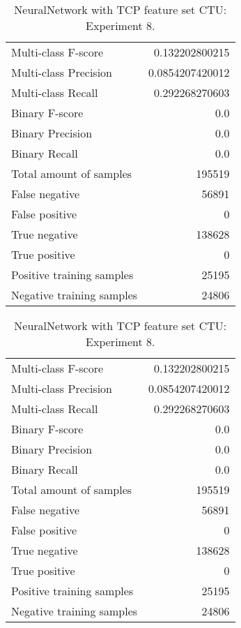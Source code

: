 \begin{table}[H]
\begin{minipage}{0.5\textwidth}
\caption{NeuralNetwork with TCP feature set CTU: \\Experiment 7.}
\centering
\begin{tabular}{l r}
\toprule
Multi-class F-score & 0.132202800215 \\
Multi-class Precision & 0.0854207420012 \\
Multi-class Recall & 0.292268270603 \\
\midrule
Binary F-score & 0.0 \\
Binary Precision & 0.0 \\
Binary Recall & 0.0 \\
\midrule
Total amount of samples & 195519 \\
False negative & 56891 \\
False positive & 0 \\
True negative & 138628 \\
True positive & 0 \\
\midrule
Positive training samples & 25195 \\
Negative training samples & 24806 \\
\bottomrule
\end{tabular}
\end{minipage}
\hfillx
\begin{minipage}{0.5\textwidth}
\caption{NeuralNetwork with TCP feature set CTU: \\Experiment 8.}
\centering
\begin{tabular}{l r}
\toprule
Multi-class F-score & 0.132202800215 \\
Multi-class Precision & 0.0854207420012 \\
Multi-class Recall & 0.292268270603 \\
\midrule
Binary F-score & 0.0 \\
Binary Precision & 0.0 \\
Binary Recall & 0.0 \\
\midrule
Total amount of samples & 195519 \\
False negative & 56891 \\
False positive & 0 \\
True negative & 138628 \\
True positive & 0 \\
\midrule
Positive training samples & 25195 \\
Negative training samples & 24806 \\
\bottomrule
\end{tabular}
\end{minipage}
\end{table}

